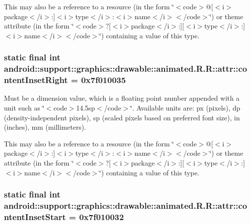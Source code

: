 This may also be a reference to a resource (in the form \char`\"{}$<$code$>$@\mbox{[}$<$i$>$package$<$/i$>$:\mbox{]}$<$i$>$type$<$/i$>$:$<$i$>$name$<$/i$>$$<$/code$>$\char`\"{}) or theme attribute (in the form \char`\"{}$<$code$>$?\mbox{[}$<$i$>$package$<$/i$>$:\mbox{]}\mbox{[}$<$i$>$type$<$/i$>$:\mbox{]}$<$i$>$name$<$/i$>$$<$/code$>$\char`\"{}) containing a value of this type. \hypertarget{classandroid_1_1support_1_1graphics_1_1drawable_1_1animated_1_1_r_1_1attr_de6f57453c5b0b5a01447c3c5e0e35ba}{
\subsubsection[{contentInsetRight}]{\setlength{\rightskip}{0pt plus 5cm}static final int android::support::graphics::drawable::animated.R.R::attr::contentInsetRight = 0x7f010035}}
\label{classandroid_1_1support_1_1graphics_1_1drawable_1_1animated_1_1_r_1_1attr_de6f57453c5b0b5a01447c3c5e0e35ba}


Must be a dimension value, which is a floating point number appended with a unit such as \char`\"{}$<$code$>$14.5sp$<$/code$>$\char`\"{}. Available units are: px (pixels), dp (density-independent pixels), sp (scaled pixels based on preferred font size), in (inches), mm (millimeters). 

This may also be a reference to a resource (in the form \char`\"{}$<$code$>$@\mbox{[}$<$i$>$package$<$/i$>$:\mbox{]}$<$i$>$type$<$/i$>$:$<$i$>$name$<$/i$>$$<$/code$>$\char`\"{}) or theme attribute (in the form \char`\"{}$<$code$>$?\mbox{[}$<$i$>$package$<$/i$>$:\mbox{]}\mbox{[}$<$i$>$type$<$/i$>$:\mbox{]}$<$i$>$name$<$/i$>$$<$/code$>$\char`\"{}) containing a value of this type. \hypertarget{classandroid_1_1support_1_1graphics_1_1drawable_1_1animated_1_1_r_1_1attr_425b5c0229212a35038a4fc3f05e0a80}{
\subsubsection[{contentInsetStart}]{\setlength{\rightskip}{0pt plus 5cm}static final int android::support::graphics::drawable::animated.R.R::attr::contentInsetStart = 0x7f010032}}
\label{classandroid_1_1support_1_1graphics_1_1drawable_1_1animated_1_1_r_1_1attr_425b5c0229212a35038a4fc3f05e0a80}


